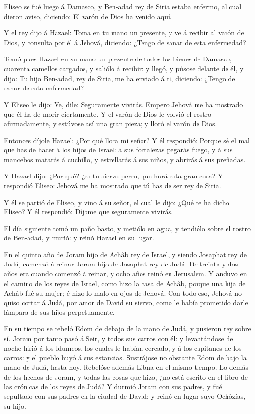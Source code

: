  Eliseo se fué luego á Damasco, y Ben-adad rey de Siria
estaba enfermo, al cual dieron aviso, diciendo: El varón de Dios ha
venido aquí.

 Y el rey dijo á Hazael: Toma en tu mano un presente, y ve á
recibir al varón de Dios, y consulta por él á Jehová, diciendo: ¿Tengo
de sanar de esta enfermedad?

 Tomó pues Hazael en su mano un presente de todos los bienes
de Damasco, cuarenta camellos cargados, y saliólo á recibir: y llegó, y
púsose delante de él, y dijo: Tu hijo Ben-adad, rey de Siria, me ha
enviado á ti, diciendo: ¿Tengo de sanar de esta enfermedad?

 Y Eliseo le dijo: Ve, dile: Seguramente vivirás. Empero
Jehová me ha mostrado que él ha de morir ciertamente.  Y el
varón de Dios le volvió el rostro afirmadamente, y estúvose así una gran
pieza; y lloró el varón de Dios.

 Entonces díjole Hazael: ¿Por qué llora mi señor? Y él
respondió: Porque sé el mal que has de hacer á los hijos de Israel: á
sus fortalezas pegarás fuego, y á sus mancebos matarás á cuchillo, y
estrellarás á sus niños, y abrirás á sus preñadas.

 Y Hazael dijo: ¿Por qué? ¿es tu siervo perro, que hará
esta gran cosa? Y respondió Eliseo: Jehová me ha mostrado que tú has de
ser rey de Siria.

 Y él se partió de Eliseo, y vino á su señor, el cual le
dijo: ¿Qué te ha dicho Eliseo? Y él respondió: Díjome que seguramente
vivirás.

 El día siguiente tomó un paño basto, y metiólo en agua, y
tendiólo sobre el rostro de Ben-adad, y murió: y reinó Hazael en su
lugar.

 En el quinto año de Joram hijo de Achâb rey de Israel, y
siendo Josaphat rey de Judá, comenzó á reinar Joram hijo de Josaphat rey
de Judá.  De treinta y dos años era cuando comenzó á
reinar, y ocho años reinó en Jerusalem.  Y anduvo en el
camino de los reyes de Israel, como hizo la casa de Achâb, porque una
hija de Achâb fué su mujer; é hizo lo malo en ojos de Jehová.
 Con todo eso, Jehová no quiso cortar á Judá, por amor de
David su siervo, como le había prometido darle lámpara de sus hijos
perpetuamente.

 En su tiempo se rebeló Edom de debajo de la mano de Judá,
y pusieron rey sobre sí.  Joram por tanto pasó á Seir, y
todos sus carros con él: y levantándose de noche hirió á los Idumeos,
los cuales le habían cercado, y á los capitanes de los carros: y el
pueblo huyó á sus estancias.  Sustrájose no obstante Edom
de bajo la mano de Judá, hasta hoy. Rebelóse además Libna en el mismo
tiempo.  Lo demás de los hechos de Joram, y todas las cosas
que hizo, ¿no está escrito en el libro de las crónicas de los reyes de
Judá?  Y durmió Joram con sus padres, y fué sepultado con
sus padres en la ciudad de David: y reinó en lugar suyo Ochôzías, su
hijo.


